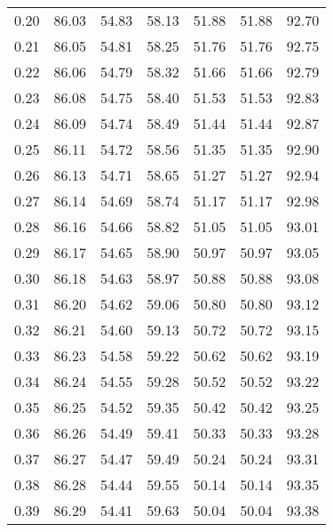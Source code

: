 \begin{tabular}{|c|c|c|c|c|c|c|}
      0.20 &     86.03 &     54.83 &      58.13 &   51.88 &      51.88 &         92.70 \\
      0.21 &     86.05 &     54.81 &      58.25 &   51.76 &      51.76 &         92.75 \\
      0.22 &     86.06 &     54.79 &      58.32 &   51.66 &      51.66 &         92.79 \\
      0.23 &     86.08 &     54.75 &      58.40 &   51.53 &      51.53 &         92.83 \\
      0.24 &     86.09 &     54.74 &      58.49 &   51.44 &      51.44 &         92.87 \\
      0.25 &     86.11 &     54.72 &      58.56 &   51.35 &      51.35 &         92.90 \\
      0.26 &     86.13 &     54.71 &      58.65 &   51.27 &      51.27 &         92.94 \\
      0.27 &     86.14 &     54.69 &      58.74 &   51.17 &      51.17 &         92.98 \\
      0.28 &     86.16 &     54.66 &      58.82 &   51.05 &      51.05 &         93.01 \\
      0.29 &     86.17 &     54.65 &      58.90 &   50.97 &      50.97 &         93.05 \\
      0.30 &     86.18 &     54.63 &      58.97 &   50.88 &      50.88 &         93.08 \\
      0.31 &     86.20 &     54.62 &      59.06 &   50.80 &      50.80 &         93.12 \\
      0.32 &     86.21 &     54.60 &      59.13 &   50.72 &      50.72 &         93.15 \\
      0.33 &     86.23 &     54.58 &      59.22 &   50.62 &      50.62 &         93.19 \\
      0.34 &     86.24 &     54.55 &      59.28 &   50.52 &      50.52 &         93.22 \\
      0.35 &     86.25 &     54.52 &      59.35 &   50.42 &      50.42 &         93.25 \\
      0.36 &     86.26 &     54.49 &      59.41 &   50.33 &      50.33 &         93.28 \\
      0.37 &     86.27 &     54.47 &      59.49 &   50.24 &      50.24 &         93.31 \\
      0.38 &     86.28 &     54.44 &      59.55 &   50.14 &      50.14 &         93.35 \\
      0.39 &     86.29 &     54.41 &      59.63 &   50.04 &      50.04 &         93.38 \\

\end{tabular}
